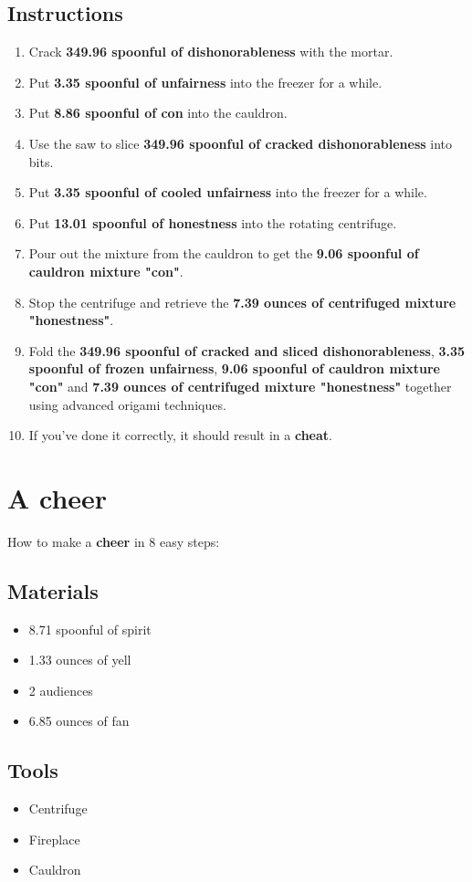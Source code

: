 \documentclass{article}
\begin{document}
\subsection{Instructions}\begin{enumerate}
\item 
Crack \textbf{349.96 spoonful of dishonorableness} with the mortar.
\item 
Put \textbf{3.35 spoonful of unfairness} into the freezer for a while.
\item 
Put \textbf{8.86 spoonful of con} into the cauldron.
\item 
Use the saw to slice \textbf{349.96 spoonful of cracked dishonorableness} into bits.
\item 
Put \textbf{3.35 spoonful of cooled unfairness} into the freezer for a while.
\item 
Put \textbf{13.01 spoonful of honestness} into the rotating centrifuge.
\item 
Pour out the mixture from the cauldron to get the \textbf{9.06 spoonful of cauldron mixture "con"}.
\item 
Stop the centrifuge and retrieve the \textbf{7.39 ounces of centrifuged mixture "honestness"}.
\item 
Fold the \textbf{349.96 spoonful of cracked and sliced dishonorableness}, \textbf{3.35 spoonful of frozen unfairness}, \textbf{9.06 spoonful of cauldron mixture "con"} and \textbf{7.39 ounces of centrifuged mixture "honestness"} together using advanced origami techniques.
\item 
If you've done it correctly, it should result in a \textbf{cheat}.
\end{enumerate}
\newpage
\section{A cheer}How to make a \textbf{cheer} in 8 easy steps:

\subsection{Materials}\begin{itemize}
\item 
8.71 spoonful of spirit
\item 
1.33 ounces of yell
\item 
2 audiences
\item 
6.85 ounces of fan
\end{itemize}
\subsection{Tools}\begin{itemize}
\item 
Centrifuge
\item 
Fireplace
\item 
Cauldron
\end{itemize}
\end{document}
